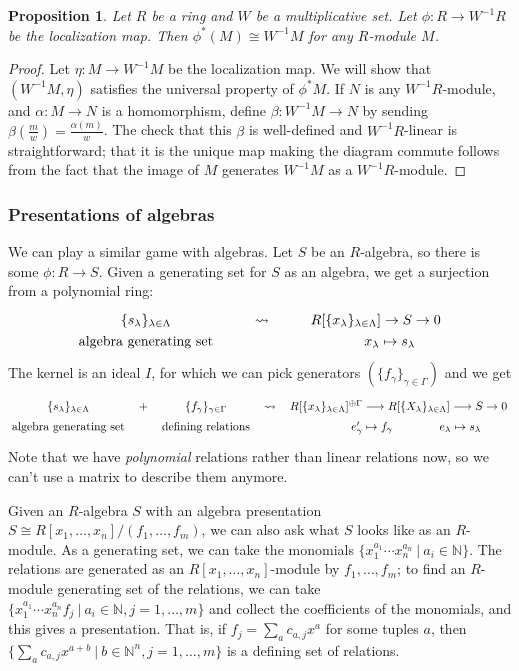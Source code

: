 \documentclass{amsart}[12pt]
\newcommand{\N}{\mathbb{N}}
\numberwithin{equation}{section}
\theoremstyle{plain} %
\newtheorem{prop}[equation]{Proposition}
\theoremstyle{definition}
\theoremstyle{remark}
\newcommand{\sssec}[1]{\subsubsection{#1}}
\begin{document}
\begin{prop} Let $R$ be a ring and $W$ be a multiplicative set. Let $\phi:R\to W^{-1}R$ be the localization map. Then $\phi^*(M)\cong W^{-1}M$ for any $R$-module $M$.
\end{prop}
\begin{proof} Let $\eta:M \to W^{-1}M$ be the localization map. We will show that $(W^{-1}M,\eta)$ satisfies the universal property of $\phi^*M$. If $N$ is any $W^{-1}R$-module, and $\alpha:M\to N$ is a homomorphism, define $\beta:W^{-1}M \to N$ by sending $\beta(\frac{m}{w}) = \frac{\alpha(m)}{w}$. The check that this $\beta$ is well-defined and $W^{-1}R$-linear is straightforward; that it is the unique map making the diagram commute follows from the fact that the image of $M$ generates $W^{-1}M$ as a $W^{-1}R$-module.
\end{proof}



\sssec{Presentations of algebras}
We can play a similar game with algebras. Let $S$ be an $R$-algebra, so there is some $\phi:R\to S$. Given a generating set for $S$ as an algebra, we get a surjection from a polynomial ring:
\[\xymatrix@R=0pc{  \{s_\lambda\}_{\lambda\in \Lambda}  & \rightsquigarrow & R[\{x_\lambda\}_{\lambda\in\Lambda}] \to S  \to 0 \\  \text{algebra generating set} & & \ \ \ \ \ \ x_\lambda \mapsto s_\lambda }\]
The kernel is an ideal $I$, for which we can pick generators $(\{f_\gamma\}_{\gamma\in \Gamma})$ and we get
\[\xymatrix@R=0pc@C=.5pc{  \{s_\lambda\}_{\lambda\in \Lambda}  & + & \{f_\gamma\}_{\gamma\in \Gamma} &  \rightsquigarrow & R[\{x_\lambda\}_{\lambda\in\Lambda}]^{\oplus \Gamma}  \longrightarrow R[\{X_\lambda\}_{\lambda\in\Lambda}] \longrightarrow S \to 0 \\  \text{algebra generating set} & & \text{defining relations} &  & \quad \qquad e'_\gamma \mapsto f_\gamma \qquad \qquad e_\lambda \mapsto s_\lambda }\]
Note that we have \emph{polynomial} relations rather than linear relations now, so we can't use a matrix to describe them anymore. 


Given an $R$-algebra $S$ with an algebra presentation $S\cong R[x_1,\dots,x_n]/(f_1,\dots,f_m)$, we can also ask what $S$ looks like as an $R$-module. As a generating set, we can take the monomials $\{x_1^{a_1}\cdots x_n^{a_n} \ | \ a_i\in \N\}$. The relations are generated as an $R[x_1,\dots,x_n]$-module by $f_1,\dots, f_m$; to find an $R$-module generating set of the relations, we can take $\{ x_1^{a_1}\cdots x_n^{a_n} f_j \ | \ a_i\in \N, j=1,\dots,m\}$ and collect the coefficients of the monomials, and this gives a presentation. That is, if $f_j = \sum_a c_{a,j} x^a$ for some tuples $a$, then $\{\sum_a c_{a,j} x^{a+b} \ | \ b\in \N^n, j=1,\dots,m\}$ is a defining set of relations. 
\end{document}
